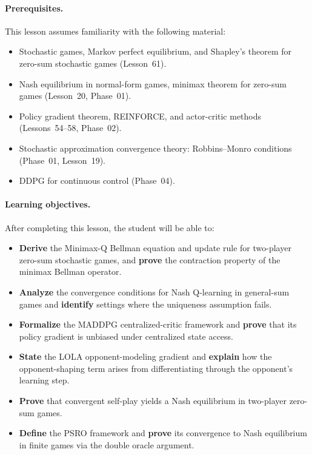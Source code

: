 \documentclass[11pt,a4paper]{article}
\begin{document}
\paragraph{Prerequisites.}
This lesson assumes familiarity with the following material:
\begin{itemize}
  \item Stochastic games, Markov perfect equilibrium, and Shapley's
    theorem for zero-sum stochastic games (Lesson~61).
  \item Nash equilibrium in normal-form games, minimax theorem for
    zero-sum games (Lesson~20, Phase~01).
  \item Policy gradient theorem, REINFORCE, and actor-critic methods
    (Lessons~54--58, Phase~02).
  \item Stochastic approximation convergence theory: Robbins--Monro
    conditions (Phase~01, Lesson~19).
  \item DDPG for continuous control (Phase~04).
\end{itemize}

\paragraph{Learning objectives.}
After completing this lesson, the student will be able to:
\begin{itemize}
  \item \textbf{Derive} the Minimax-Q Bellman equation and update rule
    for two-player zero-sum stochastic games, and \textbf{prove} the
    contraction property of the minimax Bellman operator.
  \item \textbf{Analyze} the convergence conditions for Nash Q-learning
    in general-sum games and \textbf{identify} settings where the
    uniqueness assumption fails.
  \item \textbf{Formalize} the MADDPG centralized-critic framework and
    \textbf{prove} that its policy gradient is unbiased under
    centralized state access.
  \item \textbf{State} the LOLA opponent-modeling gradient and
    \textbf{explain} how the opponent-shaping term arises from
    differentiating through the opponent's learning step.
  \item \textbf{Prove} that convergent self-play yields a Nash
    equilibrium in two-player zero-sum games.
  \item \textbf{Define} the PSRO framework and \textbf{prove} its
    convergence to Nash equilibrium in finite games via the double oracle
    argument.
\end{itemize}
\end{document}
